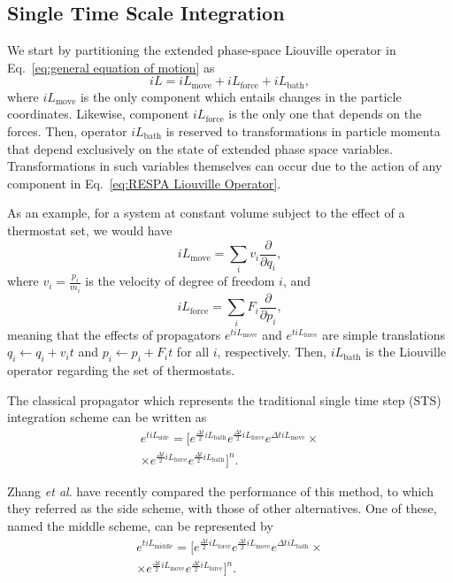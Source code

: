 \documentclass[
    journal=jctcce,
    layout=twocolumn
]{achemso}
\newcommand{\diff}[2]{\frac{\partial #2}{\partial #1}} %
\newcommand{\dof}{i}   %
\newcommand{\Liu}{i\!L}
\begin{document}
\subsection{Single Time Scale Integration}

We start by partitioning the extended phase-space Liouville operator in Eq.~\eqref{eq:general equation of motion} as
\begin{equation}
\label{eq:STS Liouville Partition}
\Liu = \Liu_\mathrm{move} + \Liu_\mathrm{force} + \Liu_\mathrm{bath},
\end{equation}
where $\Liu_\mathrm{move}$ is the only component which entails changes in the particle coordinates.
Likewise, component $\Liu_\mathrm{force}$ is the only one that depends on the forces.
Then, operator $\Liu_\mathrm{bath}$ is reserved to transformations in particle momenta that depend exclusively on the state of extended phase space variables.
Transformations in such variables themselves can occur due to the action of any component in Eq.~\eqref{eq:RESPA Liouville Operator}.

As an example, for a system at constant volume subject to the effect of a thermostat set, we would have
\begin{equation}
\Liu_\mathrm{move} = \sum_\dof v_\dof \diff{q_\dof}{},
\end{equation}
where $v_\dof = \frac{p_\dof}{m_\dof}$ is the velocity of degree of freedom $\dof$, and
\begin{equation}
\Liu_\mathrm{force} = \sum_\dof F_\dof \diff{p_\dof}{},
\end{equation}
meaning that the effects of propagators $e^{t \Liu_\mathrm{move}}$ and $e^{t \Liu_\mathrm{force}}$ are simple translations $q_\dof \leftarrow q_\dof + v_\dof t$ and $p_\dof \leftarrow p_\dof + F_\dof t$ for all $\dof$, respectively.
Then, $\Liu_\mathrm{bath}$ is the Liouville operator regarding the set of thermostats.

The classical propagator which represents the traditional single time step (STS) integration scheme can be written as
\begin{multline}
\label{eq:STS side scheme propagator}
e^{t \Liu_\mathrm{side}} = \Big[e^{\frac{\Delta t}{2} \Liu_\mathrm{bath}}
e^{\frac{\Delta t}{2} \Liu_\mathrm{force}}
e^{\Delta t \Liu_\mathrm{move}} \times \\
\times e^{\frac{\Delta t}{2} \Liu_\mathrm{force}}
e^{\frac{\Delta t}{2} \Liu_\mathrm{bath}}
\Big]^{n}.
\end{multline}

Zhang \textit{et al}. \cite{Zhang_2017} have recently compared the performance of this method, to which they referred as the side scheme, with those of other alternatives.
One of these, named the middle scheme, can be represented by
\begin{multline}
\label{eq:STS middle scheme propagator}
e^{t \Liu_\mathrm{middle}} = \Big[e^{\frac{\Delta t}{2} \Liu_\mathrm{force}}
e^{\frac{\Delta t}{2} \Liu_\mathrm{move}}
e^{\Delta t \Liu_\mathrm{bath}} \times \\
\times e^{\frac{\Delta t}{2} \Liu_\mathrm{move}}
e^{\frac{\Delta t}{2} \Liu_\mathrm{force}}
\Big]^{n}.
\end{multline}
\end{document}
